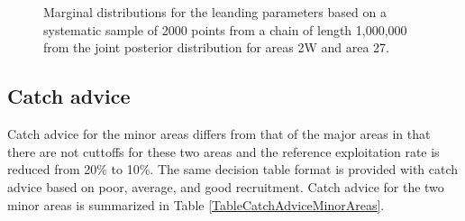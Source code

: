  \begin{figure}[!tbp]
	\centering
	\\
	\\
	\caption{Marginal distributions for the leanding parameters based on a systematic sample of 2000 points from a chain of length 1,000,000 from the joint posterior distribution for areas 2W and area 27.}\label{Results:Minor:mcmcMarginals}
\end{figure}

\subsection{Catch advice}
Catch advice for the minor areas differs from that of the major areas in that there are not cuttoffs for these two areas and the reference exploitation rate is reduced from 20\% to 10\%.  The same decision table format is provided with catch advice based on poor, average, and good recruitment. Catch advice for the two minor areas is summarized in Table \ref{TableCatchAdviceMinorAreas}.



















